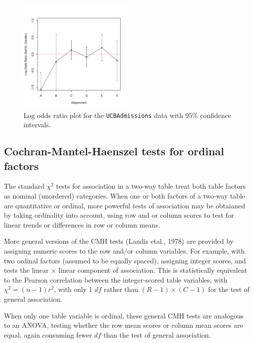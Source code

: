 \documentclass[10pt,twoside]{article}\usepackage[]{graphicx}\usepackage[]{color}
\newcommand{\data}[1]{\texttt{#1}}
\begin{document}
\begin{figure}[htb]
\begin{center}
\includegraphics[width=0.5\textwidth]{fig/vcd-tut-oddsratio}
\caption{Log odds ratio plot for the \data{UCBAdmissions} data with 95\% confidence intervals.}
\label{fig:oddsratio}
\end{center}
\end{figure}

\subsection[CMH tests: ordinal factors]{Cochran-Mantel-Haenszel tests for ordinal factors}\label{sec:CMH}
The standard $\chi^2$ tests for association in a two-way table
treat both table factors as nominal (unordered) categories.
When one or both factors of a two-way table are
quantitative or ordinal, more powerful tests of association
may be obtaianed by taking ordinality into account, using
row and or column scores to test for linear trends or differences
in row or column means.

More general versions of the CMH tests (Landis etal., 1978) are provided by assigning
numeric scores to the row and/or column variables. 
For example, with two ordinal factors (assumed to be equally spaced), assigning
integer scores,  and  tests the linear $\times$ linear component
of association. This is statistically equivalent to the Pearson correlation between the
integer-scored table variables, with $\chi^2 = (n-1) r^2$, with only 1 $df$
rather than $(R-1)\times(C-1)$ for the test of general association.

When only one table
variable is ordinal, these general CMH tests are analogous to an ANOVA, testing
whether the row mean scores or column mean scores are equal, again consuming
fewer $df$ than the test of general association.
\end{document}
